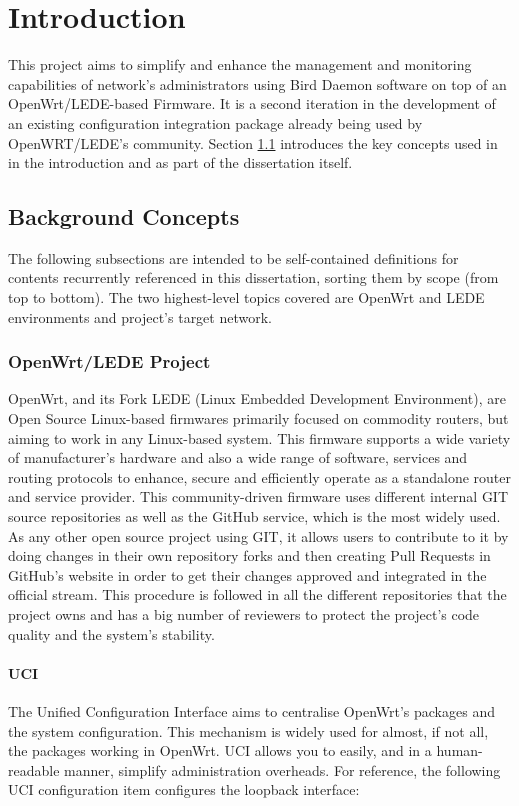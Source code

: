 \chapter{Introduction}
\label{ch:introduction}
\pagestyle{headings}

This project aims to simplify and enhance the management and monitoring capabilities of network's administrators using Bird Daemon software on top of an OpenWrt/LEDE-based Firmware. It is a second iteration in the development of an existing configuration integration package already being used by OpenWRT/LEDE's community. Section \ref{ch:backc} introduces the key concepts used in in the introduction and as part of the dissertation itself.

\section{Background Concepts}
\label{ch:backc}
The following subsections are intended to be self-contained definitions for contents recurrently referenced in this dissertation, sorting them by scope (from top to bottom). The two highest-level topics covered are OpenWrt and LEDE environments and project's target network.
\subsection{OpenWrt/LEDE Project}
\label{subsec:owrtlp}
OpenWrt, and its Fork LEDE (Linux Embedded Development Environment), are Open Source Linux-based firmwares primarily focused on commodity routers, but aiming to work in any Linux-based system. This firmware supports a wide variety of manufacturer's hardware and also a wide range of software, services and routing protocols to enhance, secure and efficiently operate as a standalone router and service provider. This community-driven firmware uses different internal GIT source repositories as well as the GitHub service, which is the most widely used. As any other open source project using GIT, it allows users to contribute to it by doing changes in their own repository forks and then creating Pull Requests in GitHub's website in order to get their changes approved and integrated in the official stream. This procedure is followed in all the different repositories that the project owns and has a big number of reviewers to protect the project's code quality and the system's stability.

\subsubsection{UCI}
The Unified Configuration Interface aims to centralise OpenWrt's packages and the system configuration. This mechanism is widely used for almost, if not all, the packages working in OpenWrt. UCI allows you to easily, and in a human-readable manner, simplify administration overheads. For reference, the following UCI configuration item configures the loopback interface: 

